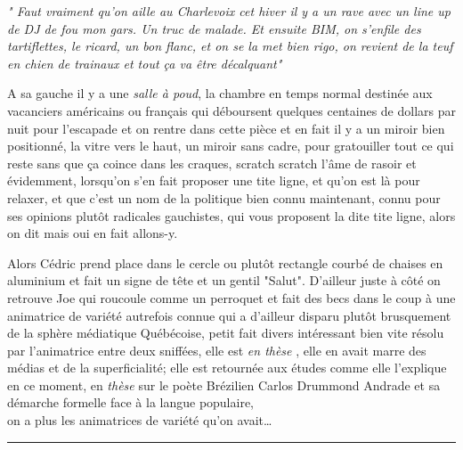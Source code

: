 \documentclass{article}
\begin{document}
\begin{paracol}{2}

\phantom
\small
\textit{"\textelp{} Faut vraiment qu'on aille au Charlevoix cet hiver
il y a un rave avec un line up de DJ de fou mon gars. Un truc de malade.
Et ensuite BIM, on s'enfile des tartiflettes, le ricard, un bon flanc,
et on se la met bien rigo, on revient de la teuf en chien de trainaux
et tout ça va être décalquant"}\\
\switchcolumn

A sa gauche il y a une \emph{salle à poud}, la chambre en temps normal
destinée aux vacanciers
américains ou français qui déboursent quelques centaines de dollars par nuit
pour l'escapade et on rentre dans cette pièce
et en fait il y a un miroir bien positionné,
la vitre vers le haut, un miroir
sans cadre, pour gratouiller tout ce qui reste sans que ça coince dans les
craques, scratch scratch l'âme de rasoir et évidemment, lorsqu'on s'en fait
proposer une tite ligne, et qu'on est là pour relaxer, et que c'est un nom de
la politique bien connu maintenant, connu pour ses opinions plutôt radicales
gauchistes, qui vous proposent la dite tite ligne, alors on dit mais oui en fait
allons-y.\\
\end{paracol}

Alors Cédric prend place dans le cercle ou plutôt rectangle courbé
de chaises en aluminium et fait un signe de tête et un gentil "Salut".
D'ailleur juste à côté on retrouve Joe qui roucoule comme un
perroquet et fait des becs dans le coup à une animatrice
de variété autrefois connue qui a d'ailleur disparu plutôt brusquement de la
sphère médiatique Québécoise, petit fait divers intéressant bien vite résolu par
l'animatrice entre deux sniffées, elle est \emph{en thèse} , elle en avait marre
des médias et de la superficialité; elle est retournée aux études comme elle
l'explique en ce moment, en \emph{thèse} sur le poète Brézilien Carlos Drummond
Andrade et sa démarche formelle face à la langue populaire, \\ on a plus les
animatrices de variété qu'on avait\ldots




\begin{center}\noindent\rule{0.5\textwidth}{0.4pt}\end{center}
\end{document}
